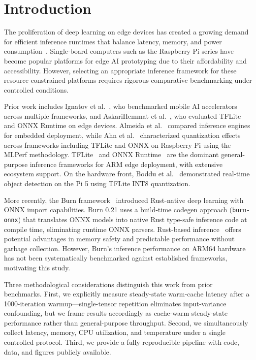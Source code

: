 \documentclass[conference]{IEEEtran}
\begin{document}
\section{Introduction}
\label{sec:intro}

The proliferation of deep learning on edge devices has created a growing demand for efficient inference runtimes that balance latency, memory, and power consumption~\cite{howard2017mobilenets, sandler2018mobilenetv2}. Single-board computers such as the Raspberry Pi series have become popular platforms for edge AI prototyping due to their affordability and accessibility. However, selecting an appropriate inference framework for these resource-constrained platforms requires rigorous comparative benchmarking under controlled conditions.

Prior work includes Ignatov et al.~\cite{ignatov2019ai}, who benchmarked mobile AI accelerators across multiple frameworks, and AskariHemmat et al.~\cite{askarihemmat2020systematic}, who evaluated TFLite and ONNX Runtime on edge devices. Almeida et al.~\cite{almeida2023benchmarking} compared inference engines for embedded deployment, while Ahn et al.~\cite{ahn2023quantization} characterized quantization effects across frameworks including TFLite and ONNX on Raspberry Pi using the MLPerf methodology. TFLite~\cite{tflite2017} and ONNX Runtime~\cite{onnx2019} are the dominant general-purpose inference frameworks for ARM edge deployment, with extensive ecosystem support. On the hardware front, Boddu et al.~\cite{yolov4pi2025} demonstrated real-time object detection on the Pi 5 using TFLite INT8 quantization.

More recently, the Burn framework~\cite{burn2024} introduced Rust-native deep learning with ONNX import capabilities. Burn 0.21 uses a build-time codegen approach (\texttt{burn-onnx}) that translates ONNX models into native Rust type-safe inference code at compile time, eliminating runtime ONNX parsers. Rust-based inference~\cite{carnelos2024microflow} offers potential advantages in memory safety and predictable performance without garbage collection. However, Burn's inference performance on ARM64 hardware has not been systematically benchmarked against established frameworks, motivating this study.

Three methodological considerations distinguish this work from prior benchmarks. First, we explicitly measure steady-state warm-cache latency after a 1000-iteration warmup---single-tensor repetition eliminates input-variance confounding, but we frame results accordingly as cache-warm steady-state performance rather than general-purpose throughput. Second, we simultaneously collect latency, memory, CPU utilization, and temperature under a single controlled protocol. Third, we provide a fully reproducible pipeline with code, data, and figures publicly available.
\end{document}

